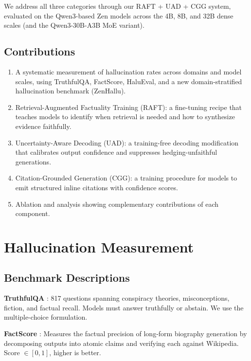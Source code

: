 \documentclass[11pt,a4paper]{article}
\begin{document}
We address all three categories through our RAFT + UAD + CGG system, evaluated on the
Qwen3-based Zen models across the 4B, 8B, and 32B dense scales (and the Qwen3-30B-A3B
MoE variant).

\subsection{Contributions}

\begin{enumerate}
    \item A systematic measurement of hallucination rates across domains and model scales,
          using TruthfulQA, FactScore, HaluEval, and a new domain-stratified hallucination
          benchmark (ZenHallu).
    \item Retrieval-Augmented Factuality Training (RAFT): a fine-tuning recipe that
          teaches models to identify when retrieval is needed and how to synthesize
          evidence faithfully.
    \item Uncertainty-Aware Decoding (UAD): a training-free decoding modification that
          calibrates output confidence and suppresses hedging-unfaithful generations.
    \item Citation-Grounded Generation (CGG): a training procedure for models to emit
          structured inline citations with confidence scores.
    \item Ablation and analysis showing complementary contributions of each component.
\end{enumerate}

\section{Hallucination Measurement}
\label{sec:measurement}

\subsection{Benchmark Descriptions}

\textbf{TruthfulQA} \cite{lin2021truthfulqa}: 817 questions spanning conspiracy theories,
misconceptions, fiction, and factual recall. Models must answer truthfully or abstain.
We use the multiple-choice formulation.

\textbf{FactScore} \cite{min2023factscore}: Measures the factual precision of long-form
biography generation by decomposing outputs into atomic claims and verifying each against
Wikipedia. Score $\in [0, 1]$, higher is better.
\end{document}
